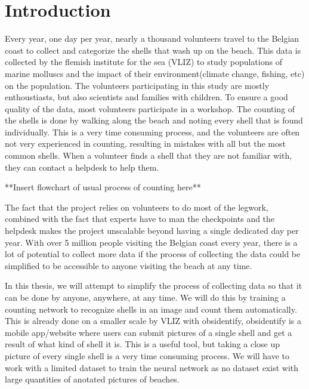 
\chapter{Introduction}

Every year, one day per year, nearly a thousand volunteers travel to the Belgian coast to collect and categorize the shells that wash up on the beach. This data is collected by the flemish institute for the sea (VLIZ) to study populations of marine molluscs and the impact of their environment(climate change, fishing, etc) on the population. The volunteers participating in this study are mostly enthoustiasts, but also scientists and families with children. To ensure a good quality of the data, most volunteers participate in a workshop. The counting of the shells is done by walking along the beach and noting every shell that is found individually. This is a very time consuming process, and the volunteers are often not very experienced in counting, resulting in mistakes with all but the most common shells. When a volunteer finds a shell that they are not familiar with, they can contact a helpdesk to help them.

**Insert flowchart of usual process of counting here**

The fact that the project relies on volunteers to do most of the legwork, combined with the fact that experts have to man the checkpoints and the helpdesk makes the project unscalable beyond having a single dedicated day per year. With over 5 million people
visiting the Belgian coast every year, there is a lot of potential to collect more data if the process of collecting the data could be simplified to be accessible to anyone visiting the beach at any time.

In this thesis, we will attempt to simplify the process of collecting data so that it can be done by anyone, anywhere, at any time. We will do this by training a counting network to recognize shells in an image and count them automatically. This is already done on a smaller scale by VLIZ with obsidentify, obsidentify is a mobile app/website where users can submit pictures of a single shell and get a result of what kind of shell it is. This is a useful tool, but taking a close up picture of every single shell is a very time consuming process. We will have to work with a limited dataset to train the neural network as no dataset exist with large quantities of anotated pictures of beaches. 

